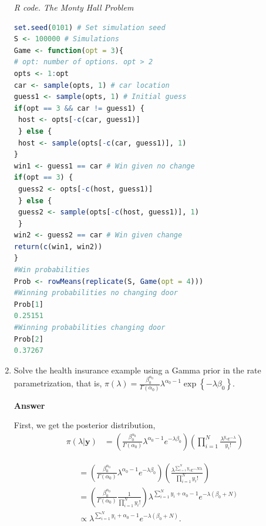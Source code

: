 \begin{enumerate}[leftmargin=*]
\begin{tcolorbox}[enhanced,width=4.67in,center upper,
	fontupper=\large\bfseries,drop shadow southwest,sharp corners]
\textit{R code. The Monty Hall Problem}
\begin{VF}
\begin{lstlisting}[language=R]
set.seed(0101) # Set simulation seed
S <- 100000 # Simulations
Game <- function(opt = 3){
# opt: number of options. opt > 2
opts <- 1:opt 
car <- sample(opts, 1) # car location
guess1 <- sample(opts, 1) # Initial guess		
if(opt == 3 && car != guess1) {
 host <- opts[-c(car, guess1)]
 } else {
 host <- sample(opts[-c(car, guess1)], 1)
}			
win1 <- guess1 == car # Win given no change			
if(opt == 3) {
 guess2 <- opts[-c(host, guess1)]
 } else {
 guess2 <- sample(opts[-c(host, guess1)], 1)
 } 			
win2 <- guess2 == car # Win given change			
return(c(win1, win2))
}
#Win probabilities
Prob <- rowMeans(replicate(S, Game(opt = 4))) 
#Winning probabilities no changing door
Prob[1]
0.25151
#Winning probabilities changing door
Prob[2]
0.37267
\end{lstlisting}
\end{VF}
\end{tcolorbox}

\item Solve the health insurance example using a Gamma prior in the rate parametrization, that is, $\pi(\lambda)=\frac{\beta_0^{\alpha_0}}{\Gamma(\alpha_0)}\lambda^{\alpha_0-1}\exp\left\{-\lambda\beta_0\right\}$.

\textbf{Answer}

First, we get the posterior distribution,
\begin{align}
	\pi\left(\lambda | \textbf{y}  \right) & = \left( \frac{\beta_0^{\alpha_0}}{\Gamma(\alpha_0)} \lambda^{\alpha_0 - 1} e^{-\lambda \beta_0} \right) \left(  \prod_{i = 1}^{N} \frac{\lambda^{y_i} e^{-\lambda}}{y_i!} \right)
\end{align}

\begin{align}
	& = \left( \frac{\beta_0^{\alpha_0}}{\Gamma(\alpha_0)} \lambda^{\alpha_0 - 1} e^{-\lambda \beta_0} \right) \left( \frac{\lambda^{\sum_{i = 1}^{N} y_i} e^{-N \lambda}}{\prod_{i = 1}^{N} y_i !}\right) \nonumber\\ 
	& = \left(  \frac{\beta_0^{\alpha_0}}{\Gamma(\alpha_0)} \frac{1}{\prod_{i = 1}^{N} y_i !} \right) \lambda^{\sum_{i = 1}^{N} y_i + \alpha_0 - 1} e^{-\lambda\left( \beta_0 + N \right) } \nonumber \\
	& \propto \lambda^{\sum_{i = 1}^{N} y_i + \alpha_0 - 1} e^{-\lambda\left( \beta_0 + N \right) }.\\ \nonumber 
\end{align}


\end{enumerate}
